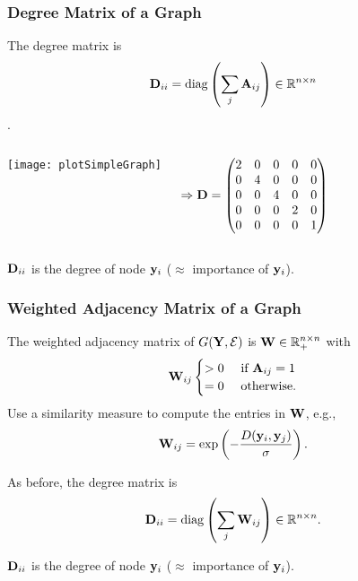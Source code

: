 \documentclass[12pt,handout]{beamer}
\begin{document}
\begin{frame}
\frametitle{Degree Matrix of a Graph}

The degree matrix is
$$ {{\bf D}}_{ii}   = {\rm diag}\left( \sum_j {\bf A}_{ij} \right)   \in \mathbb{R}^{n\times n}$$.

\bigskip

\begin{columns}
	\texttt{[image: plotSimpleGraph]}
	
	$ \Rightarrow {\bf D} = \begin{pmatrix} 2 & 0 & 0 & 0 & 0 \\
	                                     0 & 4 & 0 & 0 & 0 \\
	                                     0 & 0 & 4 & 0 & 0 \\
	                                     0 & 0 & 0 & 2 & 0 \\
	                                     0 & 0 & 0 & 0 & 1 \end{pmatrix} $
\end{columns}

\bigskip

${\bf D}_{ii}$ is the degree of node ${\bf y}_i$ ($\approx$ importance of ${\bf y}_i$). 

\end{frame}

\begin{frame}
\frametitle{Weighted Adjacency Matrix of a Graph}

The weighted adjacency matrix of $G({\bf Y},\cal E)$ is  ${\bf W} \in \mathbb{R}_{+}^{n \times n}$ with
\begin{equation*}
{\bf W}_{ij}  \begin{cases}
		 > 0 & \text{ if } {\bf A}_{ij} = 1 \\
		 = 0 & \text{ otherwise.} 
\end{cases}	
\end{equation*}
Use a similarity measure to compute the entries in ${\bf W}$, e.g.,
$$ {\bf W}_{ij} = \exp\left(-{\frac {D({\bf y}_i,{\bf y}_j)}{\sigma}} \right). $$

As before, the degree matrix is
$$ {{\bf D}}_{ii}   = {\rm diag}\left( \sum_j {\bf W}_{ij} \right)   \in \mathbb{R}^{n\times n}.$$


${\bf D}_{ii}$ is the degree of node ${\bf y}_i$ ($\approx$ importance of ${\bf y}_i$). 

\end{frame}
\end{document}
